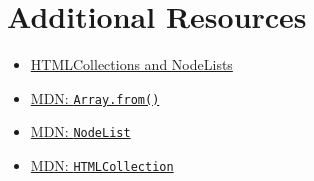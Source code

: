 \section{Additional Resources}

\begin{itemize}[leftmargin=*]
    \item \href{http://alebelcor.github.io/2011/htmlcollections-nodelists/}{HTMLCollections and NodeLists}
    \item \href{https://developer.mozilla.org/en-US/docs/Web/JavaScript/Reference/Global_Objects/Array/from}{MDN: \texttt{Array.from()}}
    \item \href{https://developer.mozilla.org/en-US/docs/Web/API/NodeList}{MDN: \texttt{NodeList}}
    \item \href{https://developer.mozilla.org/en-US/docs/Web/API/HTMLCollection}{MDN: \texttt{HTMLCollection}}
\end{itemize}
